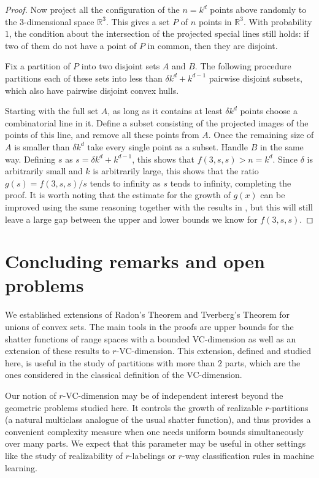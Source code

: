 \documentclass[11pt]{article}
\theoremstyle{plain}
\theoremstyle{definition}
\theoremstyle{remark}
\begin{document}
\begin{proof}
Now project all the configuration of the 
$n=k^d$ points above randomly to the
$3$-dimensional space $\mathbb{R}^3$.  This gives a set $P$ of $n$
points in  $\mathbb{R}^3$.  With probability $1$, the condition about
the intersection of the projected special lines still holds: if two of
them do not have a point of $P$ in common, then they are disjoint.

Fix a partition of $P$ into two disjoint sets $A$ and $B$.  The following
procedure partitions each of these sets into less than $\delta k^d
+k^{d-1}$ pairwise disjoint subsets, which also have pairwise disjoint
convex hulls.

Starting with the full set $A$, as long as it contains at least $\delta
k^d$ points choose a combinatorial line in it. Define a subset consisting of the projected images of the points of this line, and remove all these
points  from $A$. Once the remaining size of $A$ is smaller than $\delta
k^d$ take every single point as a subset.  Handle $B$ in the same way.
Defining $s$  as $s =\delta k^d + k^{d-1}$, this shows that
$f(3,s,s) >
n=k^d$. Since $\delta$ is arbitrarily small and $k$ is arbitrarily large,
this shows that the ratio $g(s)=f(3,s,s)/s$  tends to infinity as $s$
tends to infinity, completing the proof.  It is worth noting that the
estimate for the growth of $g(x)$ can be improved using the same reasoning together with the results in
\cite{BSa2020}, but this will still leave a large gap between the upper
and lower bounds we know for $f(3,s,s)$.
\end{proof}
\fi

\section{Concluding remarks and open problems}
\label{sec:conclusion}

We established extensions of Radon's Theorem and Tverberg's Theorem for unions of convex sets. The main tools in the proofs are upper bounds for the shatter functions of range spaces with a bounded VC-dimension as well as an extension of these results to $r$-VC-dimension. This extension, defined and studied here, is useful in the study of partitions with more than $2$ parts, which are the ones considered in the classical definition of the VC-dimension.

Our notion of $r$-VC-dimension may be of independent interest beyond the geometric problems studied here. It controls the growth of realizable $r$-partitions (a natural multiclass analogue of the usual shatter function), and thus provides a convenient complexity measure when one needs uniform bounds simultaneously over many parts. We expect that this parameter may be useful in other settings like the study of realizability of $r$-labelings or $r$-way classification rules in machine learning.
\end{document}
